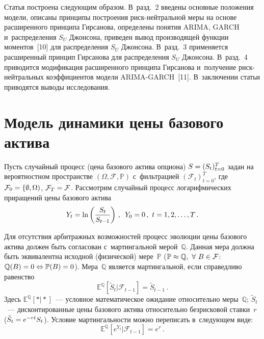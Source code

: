 \begin{multicols}{2}
  Статья построена следующим образом. В~разд.~2 введены основные 
положения модели, описаны принципы построения риск-нейтральной меры на 
основе расширенного принципа Гирсанова, определены понятия ARIMA, 
GARCH и~распределения $S_U$ Джонсона, приведен вывод производящей 
функции моментов~[10] для распределения $S_U$ Джонсона. В~разд.~3 
применяется расширенный принцип Гирсанова для распределения $S_U$ 
Джонсона. В~разд.~4 приводится модификация расширенного принципа 
Гирсанова и~получение риск-нейт\-раль\-ных коэффициентов модели  
ARIMA-GARCH~[11]. В~заключении статьи приводятся выводы исследования.
  
\section{Модель динамики цены базового актива}
 
  Пусть случайный процесс (цена базового актива опциона) $S\hm= 
(S_t)^T_{t=0}$ задан на вероятностном пространстве $(\Omega, \mathcal{F}, 
\mathbb{P})$ с~фильтрацией $(\mathcal{F}_t)^T_{t=0}$, где $\mathcal{F}_0\hm= 
\{\emptyset, \Omega)$, $\mathcal{F}_T\hm=\mathcal{F}$. Рассмотрим случайный 
процесс логарифмических приращений цены базового актива
  \begin{equation*}
  Y_t=\ln \left( \displaystyle\frac{\displaystyle S_t\mathstrut}{\displaystyle S_{t-1}\mathstrut}\right)\,,\enskip Y_0=0\,,\ t=1,2,\ldots ,T\,.
  \end{equation*}
  
  Для отсутствия арбитражных возможностей процесс эволюции цены 
базового актива должен быть согласован с~мартингальной мерой~$\mathbb{Q}$. 
Данная мера должна быть эквивалентна исходной (физической) 
мере~$\mathbb{P}$ ($\mathbb{P}\hm\approx \mathbb{Q}, \ \forall~B\hm\in 
\mathcal{F}$: $\mathbb{Q}(B)\hm=0\hm\Leftrightarrow \mathbb{P}(B)\hm=0$). 
Мера~$\mathbb{Q}$ является мартингальной, если справедливо равенство
  \begin{equation*}
  \mathbb{E}^{\mathbb{Q}}\left[ \tilde{S}_t \vert \mathcal{F}_{t-1}\right] 
=\tilde{S}_{t-1}\,.
  \end{equation*}
Здесь $\mathbb{E}^{\mathbb{Q}}[*\vert *]$~--- условное математическое 
ожидание относительно меры~$\mathbb{Q}$; $\tilde{S}_t$~--- 
дисконтированные цены базового актива относительно безрисковой ставки~$r$ 
($\tilde{S}_t\hm=e^{-rt}S_t$). Условие мартингальности можно переписать 
в~следующем виде:
\begin{equation*}
\mathbb{E}^{\mathbb{Q}} \left[ e^{Y_t}\vert \mathcal{F}_{t-
1}\right] =e^r\,.
\end{equation*}
  

\end{multicols}
